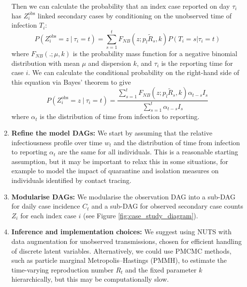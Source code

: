\documentclass{article}
\begin{document}
\begin{enumerate}
   Then we can calculate the probability that an index case reported on day $\tau_i$ has $Z^\mathrm{obs}_i$ linked secondary cases by conditioning on the unobserved time of infection $T_i$:
   \begin{equation}
       P(Z^\mathrm{obs}_i=z \ | \ \tau_i=t) = \sum_{s=1}^{t} F_{NB}(z; p_l\tilde{R}_s,k) P(T_i=s | \tau_i=t)
   \end{equation}
where $F_{NB}(.;\mu,k)$ is the probability mass function for a negative binomial distribution with mean $\mu$ and dispersion $k$, and $\tau_i$ is the reporting time for case $i$.  We can calculate the conditional probability on the right-hand side of this equation via Bayes' theorem to give
   \begin{equation} \label{eq:Zobs}
       P(Z^\mathrm{obs}_i=z \ | \ \tau_i=t) = \frac{\sum_{s=1}^{t} F_{NB}(z; p_l\tilde{R}_s,k) \alpha_{t-s} I_s}{\sum_{s=1}^{t}\alpha_{t-s} I_s}  
   \end{equation}
 where $\alpha_t$ is the distribution of time from infection to reporting.

    \item \textbf{Refine the model DAGs:}  We start by assuming that the relative infectiousness profile over time $w_t$ and the distribution of time from infection to reporting $\alpha_t$ are the same for all individuals. This is a reasonable starting assumption, but it may be important to relax this in some situations, for example to model the impact of quarantine and isolation measures on individuals identified by contact tracing.

    \item \textbf{Modularise DAGs:} We modularise the observation DAG into a sub-DAG for daily case incidence $C_t$ and a sub-DAG for observed secondary case counts $Z_i$ for each index case $i$ (see Figure \ref{fig:case_study_diagram}).  
    
    \item \textbf{Inference and implementation choices:} We suggest using NUTS with data augmentation for unobserved transmissions, chosen for efficient handling of discrete latent variables. Alternatively, we could use PMCMC methods, such as particle marginal Metropolis–Hastings (PMMH), to estimate the time-varying reproduction number $R_t$ and the fixed parameter $k$ hierarchically, but this may be computationally slow. 


\end{enumerate}
\end{document}
